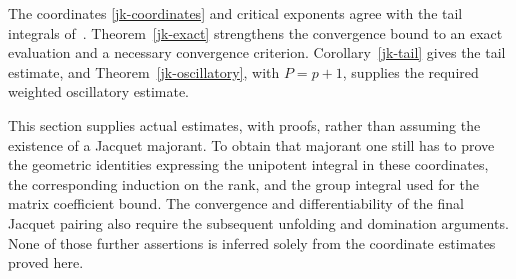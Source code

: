 The coordinates \eqref{jk-coordinates} and critical exponents
agree with the tail integrals of~\cite{alpo-uniform-source}.
Theorem~\ref{jk-exact} strengthens the convergence bound to an
exact evaluation and a necessary convergence criterion.
Corollary~\ref{jk-tail} gives the tail estimate, and
Theorem~\ref{jk-oscillatory}, with \(P=p+1\), supplies the
required weighted oscillatory estimate.

This section supplies actual estimates, with proofs, rather than
assuming the existence of a Jacquet majorant.
To obtain that majorant one still has to prove the geometric
identities expressing the unipotent integral in these coordinates,
the corresponding induction on the rank, and the group integral
used for the matrix coefficient bound.
The convergence and differentiability of the final Jacquet
pairing also require the subsequent unfolding and domination
arguments.  None of those further assertions is inferred solely
from the coordinate estimates proved here.



